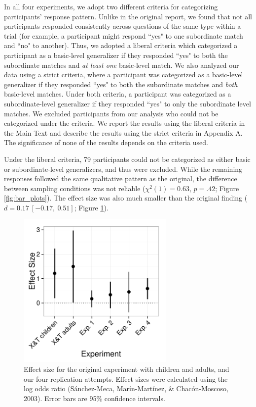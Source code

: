 \documentclass[man]{apa2}
\begin{document}
In all four experiments, we adopt two different criteria for categorizing participants' response pattern. Unlike in the original report, we found that not all participants responded consistently across questions of the same type within a trial (for example, a participant might respond ``yes" to one subordinate match and ``no" to another). Thus, we adopted a liberal criteria which categorized a participant as a basic-level generalizer if they responded ``yes" to both the subordinate matches and {\it at least one} basic-level match. We also analyzed our data using a strict criteria, where a participant was categorized as a basic-level generalizer if they responded ``yes" to both the subordinate matches and {\it both} basic-level matches.  Under both criteria, a participant was categorized as a subordinate-level generalizer if they responded ``yes" to only the subordinate level matches.  We excluded participants from our analysis who could not be categorized under the criteria. We report the results using the liberal criteria in the Main Text and describe the results using the strict criteria in Appendix A. The significance  of none of the results depends on the criteria used. 

Under the liberal criteria, 79 participants could not be categorized as either basic or subordinate-level generalizers, and thus were excluded. While the  remaining responses followed the same qualitative pattern as the original, the difference  between sampling conditions was not reliable ($\chi^2(1) = 0.63$,  $p = .42$; Figure \ref{fig:bar_plots}). The effect size was also much smaller than the original finding ($d = 0.17\ [-0.17,\ 0.51]$; Figure \ref{fig:effect_sizes}).

 \begin{figure} [t]
  \includegraphics[width=3in]{figures/FIG_3.pdf} 
  \caption{\label{fig:effect_sizes} Effect size for the original experiment with children and adults, and our four replication attempts.  Effect sizes were calculated using the log odds ratio (S\'{a}nchez-Meca, Mar\'{i}n-Mart\'{i}nez, \& Chac\'{o}n-Moscoso, 2003). Error bars are 95\% confidence intervals.} 
\end{figure}
\end{document}
